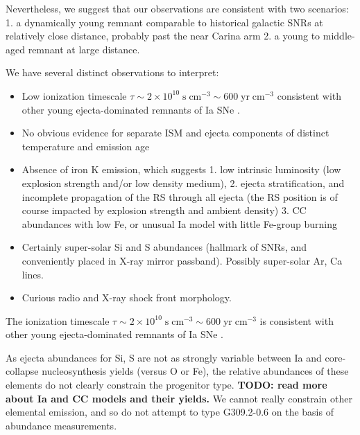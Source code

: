 \documentclass[preprint2,tighten,trackchanges]{aastex6}
\newcommand*{\mt}{\mathrm}
\newcommand*{\unit}[1]{\;\mt{#1}}  %
\newcommand*{\TauUnits}{\unit{s\;cm^{-3}}}
\begin{document}
Nevertheless, we suggest that our observations are consistent with two
scenarios:
1. a dynamically young remnant comparable to historical galactic SNRs at
relatively close distance, probably past the near Carina arm
2. a young to middle-aged remnant at large distance.

We have several distinct observations to interpret:
\begin{itemize}
    \item Low ionization timescale
        $\tau \sim 2 \times 10^{10} \TauUnits \sim 600 \unit{yr\;cm^{-3}}$
        consistent with other young ejecta-dominated remnants of Ia SNe
        \citep[][Table 4]{badenes2007}.
    \item No obvious evidence for separate ISM and ejecta components of
        distinct temperature and emission age
    \item Absence of iron K emission, which
        suggests
        1. low intrinsic luminosity (low explosion strength and/or low density
           medium),
        2. ejecta stratification, and incomplete propagation of the RS through
           all ejecta (the RS position is of course impacted by explosion strength
           and ambient density)
        3. CC abundances with low Fe, or unusual Ia model with little Fe-group
           burning
   \item Certainly super-solar Si and S abundances (hallmark of SNRs, and
       conveniently placed in X-ray mirror passband).
       Possibly super-solar Ar, Ca lines.
    \item Curious radio and X-ray shock front morphology.
\end{itemize}

The ionization timescale
$\tau \sim 2 \times 10^{10} \TauUnits \sim 600 \unit{yr\;cm^{-3}}$
is consistent with other young ejecta-dominated remnants of Ia SNe
\citep[][Table 4]{badenes2007}.

As ejecta abundances for Si, S are not as strongly variable between Ia and
core-collapse nucleosynthesis yields (versus O or Fe), the relative abundances
of these elements do not clearly constrain the progenitor type.
\textbf{TODO: read more about Ia and CC models and their yields.}
We cannot really constrain other elemental emission, and so do not attempt to
type G309.2-0.6 on the basis of abundance measurements.

\end{document}
